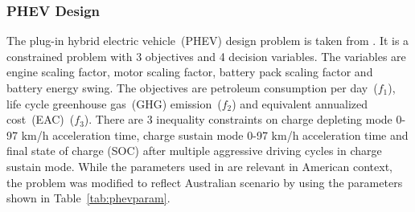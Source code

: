 \subsubsection{PHEV Design}
The plug-in hybrid electric vehicle~(PHEV) design problem is taken from \cite{shiau2010optimal}. It is a constrained problem with 3 objectives and 4 decision variables. The variables are engine scaling factor, motor scaling factor, battery pack scaling factor and battery energy swing. The objectives are petroleum consumption per day~($f_1$), life cycle greenhouse gas~(GHG) emission~($f_2$) and equivalent annualized cost~(EAC)~($f_3$). There are 3 inequality constraints on charge depleting mode 0-97 km/h acceleration time, charge sustain mode 0-97 km/h acceleration time and final state of charge (SOC) after multiple aggressive driving cycles in charge sustain mode. While the parameters used in \cite{shiau2010optimal} are relevant in American context, the problem was modified to reflect Australian scenario by using the parameters shown in Table~\ref{tab:phevparam}. 

